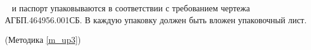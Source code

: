 \dut \
и паспорт упаковываются в соответствии с требованием чертежа АГБП.464956.001СБ. В каждую упаковку должен быть вложен упаковочный лист.


\begin{flushright}
	(Методика \ref{m_up3})
\end{flushright}